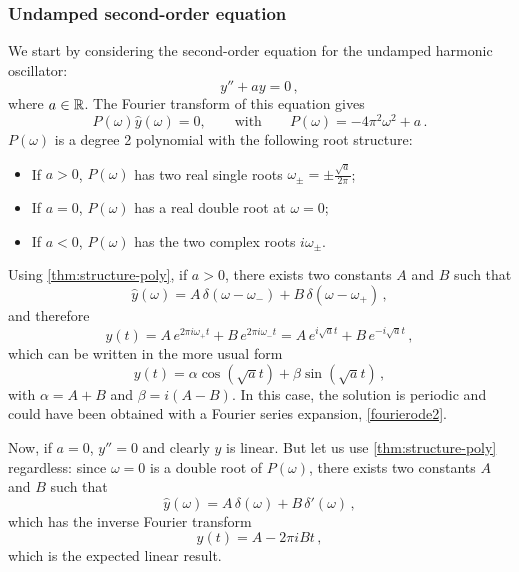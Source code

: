 \subsubsection{Undamped second-order equation}
We start by considering the second-order equation for the undamped harmonic oscillator:
\begin{equation}
  y''+ay=0\,,
\end{equation}
where $a\in\mathbb{R}$. The Fourier transform of this equation gives
\begin{equation}
  P(\omega)\hat{y}(\omega)=0,\qquad\text{with}\qquad P(\omega)=-4\pi^2\omega^2+a\,.
\end{equation}
$P(\omega)$ is a degree 2 polynomial with the following root structure:
\begin{itemize}
  \item If $a>0$, $P(\omega)$ has two real single roots
    $\omega_{\pm}=\pm\frac{\sqrt{a}}{2\pi}$;
  \item If $a=0$, $P(\omega)$ has a real double root at $\omega=0$;
  \item If $a<0$, $P(\omega)$ has the two complex roots $i\omega_{\pm}$.
\end{itemize}
Using \cref{thm:structure-poly}, if $a>0$, there exists two constants $A$ and $B$ such
that
\begin{equation}
  \hat{y}(\omega)=A\,\delta(\omega-\omega_-)+B\,\delta(\omega-\omega_+)\,,
\end{equation}
and therefore
\begin{equation}
  y(t)=A\,e^{2\pi i\omega_+t}+B\,e^{2\pi i\omega_-t}=A\,e^{i\sqrt{a}t}+B\,e^{-i\sqrt{a}t}\,,
  \label{eq:ode2-periodic}
\end{equation}
which can be written in the more usual form
\begin{equation}
  y(t)=\alpha\cos(\sqrt{a}t)+\beta\sin(\sqrt{a}t)\,,
\end{equation}
with $\alpha=A+B$ and $\beta=i(A-B)$. In this case, the solution is periodic and could
have been obtained with a Fourier series expansion, \cf\cref{fourierode2}.

Now, if $a=0$, $y''=0$ and clearly $y$ is linear. But let us use \cref{thm:structure-poly}
regardless: since $\omega=0$ is a double root of $P(\omega)$, there exists two constants
$A$ and $B$ such that
\begin{equation}
  \hat{y}(\omega)=A\,\delta(\omega)+B\,\delta'(\omega)\,,
\end{equation}
which has the inverse Fourier transform
\begin{equation}
  y(t)=A-2\pi i Bt\,,
\end{equation}
which is the expected linear result.

